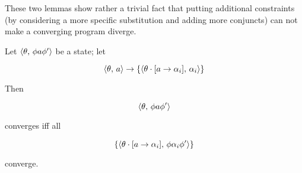 These two lemmas show rather a trivial fact that putting additional constraints (by considering a more specific substitution and adding
more conjuncts) can not make a converging program diverge.

\begin{lemma}
  \label{lem:convergence-preservation}

  Let $\langle \theta,\,\phi a \phi^\prime \rangle$ be a state; let

  \[
  \langle \theta,\,a \rangle\to\{\langle \theta\cdot[a\to\alpha_i],\,\alpha_i \rangle\}
  \]
  
  Then

  \[
  \langle \theta,\,\phi a \phi^\prime \rangle
  \]

  converges iff all

  \[
  \{\langle \theta\cdot[a\to\alpha_i],\,\phi\alpha_i\phi^\prime \rangle\}
  \]

  converge.
\end{lemma}
